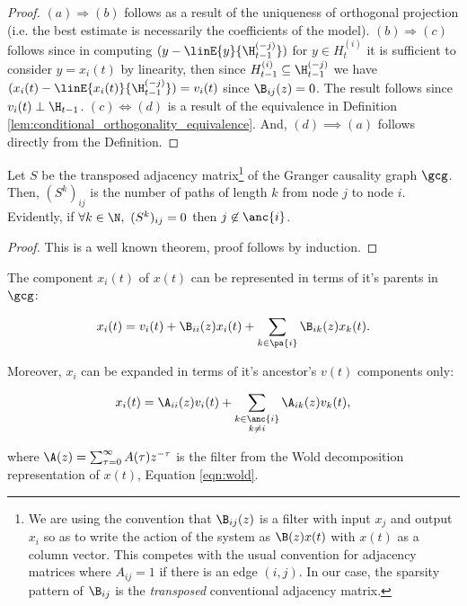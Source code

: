 \begin{proof}
  $(a) \Rightarrow (b)$ follows as a result of the uniqueness of orthogonal
  projection (i.e. the best estimate is necessarily the coefficients
  of the model).  $(b) \Rightarrow (c)$ follows since in computing
  $(y - \linE{y}{\H_{t - 1}^{(-j)}})$ for $y \in H_t^{(i)}$ it is sufficient
  to consider $y = x_i(t)$ by linearity, then since
  $H_{t - 1}^{(i)} \subseteq \H_{t - 1}^{(-j)}$ we have
  $(x_i(t) - \linE{x_i(t)}{\H_{t - 1}^{(-j)}}) = v_i(t)$ since
  $\B_{ij}(z) = 0$.  The result follows since
  $v_i(t) \perp \H_{t - 1}$.  $(c) \iff (d)$ is a result of the equivalence
  in Definition \ref{lem:conditional_orthogonality_equivalence}.  And,
  $(d) \implies (a)$ follows directly from the Definition.
\end{proof}

\begin{lemma}
  \label{lem:adj_matrix}
  Let $S$ be the transposed adjacency matrix\footnote{\footnotesize We
    are using the convention that $\B_{ij}(z)$ is a filter with input
    $x_j$ and output $x_i$ so as to write the action of the system as
    $\B(z)x(t)$ with $x(t)$ as a column vector.  This competes with
    the usual convention for adjacency matrices where $A_{ij} = 1$ if
    there is an edge $(i, j)$.  In our case, the sparsity pattern of
    $\B_{ij}$ is the \textit{transposed} conventional adjacency
    matrix.} of the Granger causality graph $\gcg$.  Then,
  $(S^k)_{ij}$ is the number of paths of length $k$ from node $j$ to
  node $i$.  Evidently, if $\forall k \in \N,\ (S^k)_{ij} = 0$ then
  $j \not\in \anc{i}$.
\end{lemma}
\begin{proof}
  This is a well known theorem, proof follows by induction.
\end{proof}

\begin{proposition}
  \label{prop:parent_expanding}
  The component $x_i(t)$ of $x(t)$ can be represented in terms of it's
  parents in $\gcg$:

  \begin{equation}
    \label{eqn:parent_expansion}
    x_i(t) = v_i(t) + \B_{ii}(z)x_i(t) + \sum_{k \in \pa{i}}\B_{ik}(z)x_k(t).
  \end{equation}

  Moreover, $x_i$ can be expanded in terms of it's ancestor's $v(t)$
  components only:

  \begin{equation}
    \label{eqn:ancestor_expansion}
    x_i(t) = \A_{ii}(z)v_i(t) + \sum_{\substack{k \in \anc{i} \\ k \ne i}}\A_{ik}(z)v_k(t),
  \end{equation}

  where $\A(z) = \sum_{\tau = 0}^\infty A(\tau)z^{-\tau}$ is the filter from
  the Wold decomposition representation of $x(t)$, Equation
  \eqref{eqn:wold}.
\end{proposition}

